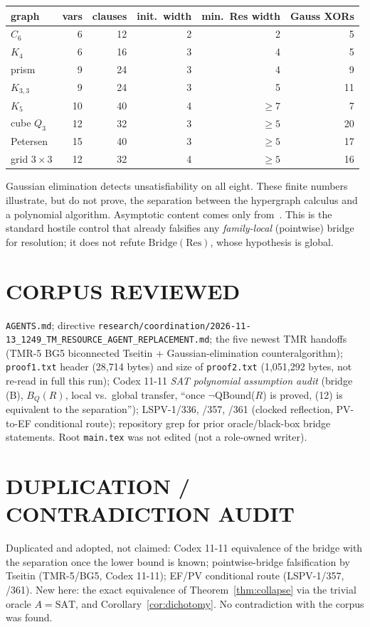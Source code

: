 \documentclass[11pt]{article}
\theoremstyle{definition}
\newcommand{\SAT}{\mathrm{SAT}}
\begin{document}
\begin{center}
\begin{tabular}{@{}lrrrrr@{}}
\toprule
graph & vars & clauses & init.\ width & min.\ Res width & Gauss XORs\\
\midrule
$C_6$ & 6 & 12 & 2 & 2 & 5\\
$K_4$ & 6 & 16 & 3 & 4 & 5\\
prism & 9 & 24 & 3 & 4 & 9\\
$K_{3,3}$ & 9 & 24 & 3 & 5 & 11\\
$K_5$ & 10 & 40 & 4 & $\ge 7$ & 7\\
cube $Q_3$ & 12 & 32 & 3 & $\ge 5$ & 20\\
Petersen & 15 & 40 & 3 & $\ge 5$ & 17\\
grid $3\times3$ & 12 & 32 & 4 & $\ge 5$ & 16\\
\bottomrule
\end{tabular}
\end{center}
Gaussian elimination detects unsatisfiability on all eight. These finite numbers illustrate, but do not
prove, the separation between the hypergraph calculus and a polynomial algorithm. Asymptotic content
comes only from~\cite{BSW01,Urq87}. This is the standard hostile control that already falsifies any
\emph{family-local} (pointwise) bridge for resolution; it does not refute $\mathrm{Bridge}(\mathrm{Res})$,
whose hypothesis is global.

\section*{CORPUS REVIEWED}
\texttt{AGENTS.md}; directive \texttt{research/coordination/2026-11-13\_1249\_TM\_RESOURCE\_AGENT\_REPLACEMENT.md};
the five newest TMR handoffs (TMR-5 BG5 biconnected Tseitin + Gaussian-elimination counteralgorithm);
\texttt{proof1.txt} header (28{,}714 bytes) and size of \texttt{proof2.txt} (1{,}051{,}292 bytes, not
re-read in full this run); Codex 11-11 \emph{SAT polynomial assumption audit} (bridge (B), $B_Q(R)$, local
vs.\ global transfer, ``once $\neg$QBound($R$) is proved, (12) is equivalent to the separation'');
LSPV-1/336, /357, /361 (clocked reflection, PV-to-EF conditional route); repository grep for prior
oracle/black-box bridge statements. Root \texttt{main.tex} was not edited (not a role-owned writer).

\section*{DUPLICATION / CONTRADICTION AUDIT}
Duplicated and adopted, not claimed: Codex 11-11 equivalence of the bridge with the separation once the
lower bound is known; pointwise-bridge falsification by Tseitin (TMR-5/BG5, Codex 11-11); EF/PV conditional
route (LSPV-1/357, /361). New here: the exact equivalence of Theorem~\ref{thm:collapse} via the trivial
oracle $A=\SAT$, and Corollary~\ref{cor:dichotomy}. No contradiction with the corpus was found.
\end{document}
